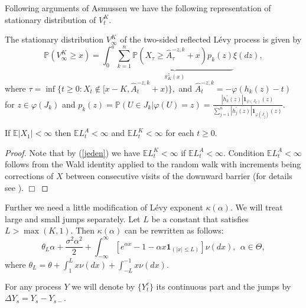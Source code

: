 \documentclass{aptpub}
\begin{document}
Following arguments of Asmussen \cite[p. 393-394]{2}
we have the following representation of stationary distribution of $V_t^K$.
 \begin{lem}
The stationary distribution $V_\infty^K$ of the two-sided reflected L\'{e}vy process is given by $$\mathbb{P}(V_\infty^K\geq x)=\int_0^{a}
\underbrace{\sum_{k=1}^n\mathbb{P}(X_{\tau}\geq \widehat{A}_\tau^{-z,k} +x)p_k(z)}_{\overline{\pi}_K^z(x)}\xi(dz),$$ where $\tau =\inf\{t\geq 0:X_t \notin [x-K, \widehat{A}_t^{-z,k}+x)\},$ and $\widehat{A}_t^{-z,k}=-\varphi(h_k(z)-t)$ for $z\in \varphi(J_k)$ and
$p_k(z)=\mathbb{P}(U\in J_k|\varphi(U)=z)=\frac{|h_k^{'}(z)|\mathbf{1}_{\varphi(J_k)}(z)}{\sum_{j=1}^n|h_j^{'}(z)|\mathbf{1}_{\varphi(J_j)}(z)}$.
\end{lem}

\begin{lem}\label{Fact}
If $\mathbb{E}|X_1|<\infty$ then $\mathbb{E}L_t^A<\infty$ and $\mathbb{E}L_t^K<\infty$ for each $t\geq 0$.
\end{lem}
\begin{proof}
Note that by (\ref{jeden}) we have $\mathbb{E}L_t^K<\infty$ if $\mathbb{E}L_t^A<\infty$. Condition $\mathbb{E}L_t^A<\infty$ follows from the Wald identity 
applied to the random walk with increments being corrections of $X$ between consecutive visits of the downward barrier (for details see \cite{AP}).
{\newline\vspace{3mm}\hfill $\Box$}
\end{proof}

Further we need a little modification of L\'{e}vy exponent $\kappa(\alpha)$. We will treat large and small jumps separately. Let $L$ be a constant that satisfies $L>\max(K,1)$. Then $\kappa(\alpha)$ can be rewritten as follows:
\begin{equation}\theta_L\alpha+\frac{\sigma^2\alpha^2}{2}+\int_{-\infty}^{\infty}[e^{\alpha x}-1-\alpha x\mathbf{1}_{(|x|\leq L)}]\nu(dx),\ \ \alpha\in\Theta,\end{equation}
where $\theta_L=\theta+\int_1^Lx\nu(dx)+\int_{-L}^{-1}x\nu(dx).$

For any process $Y$ we will denote by $\{Y_t^c\}$ its continuous part and the jumps by $\Delta Y_s=Y_s-Y_{s-}$.
\end{document}
